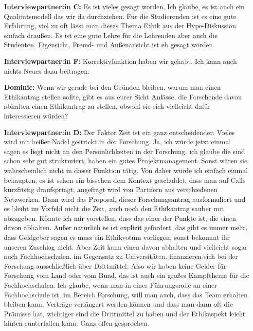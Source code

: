 \documentclass[a4paper,12pt,twoside,numbers=noendperiod]{scrreprt}
\begin{document}
\textbf{Interviewpartner:in C:} Es ist vieles gesagt worden. Ich glaube, es ist auch ein Qualitätsmodell das wir da durchziehen. Für die Studierenden ist es eine gute Erfahrung, viel zu oft lässt man dieses Thema Ethik aus der Hype-Diskussion einfach draußen. Es ist eine gute Lehre für die Lehrenden aber auch die Studenten. Eigensicht, Fremd- und Außenansicht ist eh gesagt worden.

\textbf{Interviewpartner:in F:} Korrektivfunktion haben wir gehabt. Ich kann auch nichts Neues dazu beitragen.

\textbf{Dominic:} Wenn wir gerade bei den Gründen bleiben, warum man einen Ethikantrag stellen sollte, gibt es aus eurer Sicht Anlässe, die Forschende davon abhalten einen Ethikantrag zu stellen, obwohl sie sich vielleicht dafür interessieren würden?

\textbf{Interviewpartner:in D:} Der Faktor Zeit ist ein ganz entscheidender. Vieles wird mit heißer Nadel gestrickt in der Forschung. Ja, ich würde jetzt einmal sagen es liegt nicht an den Persönlichkeiten in der Forschung, ich glaube die sind schon sehr gut strukturiert, haben ein gutes Projektmanagement. Sonst wären sie wahrscheinlich nicht in dieser Funktion tätig. Von daher würde ich einfach einmal behaupten, es ist schon ein bisschen dem Kontext geschuldet, dass man auf Calls kurzfristig draufspringt, angefragt wird von Partnern aus verschiedenen Netzwerken. Dann wird das Proposal, dieser Forschungsantrag ausformuliert und es bleibt im Vorfeld nicht die Zeit, auch noch den Ethikantrag sauber mit abzugeben. Könnte ich mir vorstellen, dass das einer der Punkte ist, die einen davon abhalten. Außer natürlich es ist explizit gefordert, das gibt es immer mehr, dass Geldgeber sagen es muss ein Ethikvotum vorliegen, sonst bekommt ihr unseren Zuschlag nicht. Aber Zeit kann einen davon abhalten und vielleicht sogar auch Fachhochschulen, im Gegensatz zu Universitäten, finanzieren sich bei der Forschung ausschließlich über Drittmittel. Also wir haben keine Gelder für Forschung vom Land oder vom Bund, das ist auch ein großes Kampfthema für die Fachhochschulen. Ich glaube, wenn man in einer Führungsrolle an einer Fachhochschule ist, im Bereich Forschung, will man auch, dass das Team erhalten bleiben kann, Verträge verlängert werden können und dass man dann oft die Prämisse hat, wichtiger sind die Drittmittel zu haben und der Ethikaspekt leicht hinten runterfallen kann. Ganz offen gesprochen.
\end{document}
